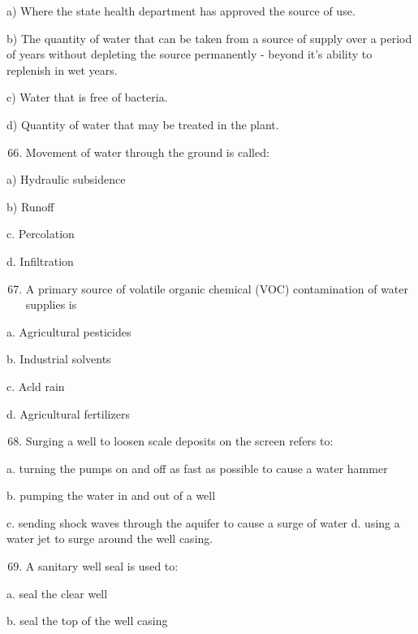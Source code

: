 \documentclass[10pt]{article}
\begin{document}
a) Where the state health department has approved the source of use.

b) The quantity of water that can be taken from a source of supply over a period of years without depleting the source permanently - beyond it's ability to replenish in wet years.

c) Water that is free of bacteria.

d) Quantity of water that may be treated in the plant.

\begin{enumerate}
  \setcounter{enumi}{65}
  \item Movement of water through the ground is called:
\end{enumerate}

a) Hydraulic subsidence

b) Runoff

c. Percolation

d. Infiltration

\begin{enumerate}
  \setcounter{enumi}{66}
  \item A primary source of volatile organic chemical (VOC) contamination of water supplies is
\end{enumerate}

a. Agricultural pesticides

b. Industrial solvents

c. Acld rain

d. Agricultural fertilizers

\begin{enumerate}
  \setcounter{enumi}{67}
  \item Surging a well to loosen scale deposits on the screen refers to:
\end{enumerate}

a. turning the pumps on and off as fast as possible to cause a water hammer

b. pumping the water in and out of a well

c. sending shock waves through the aquifer to cause a surge of water d. using a water jet to surge around the well casing.

\begin{enumerate}
  \setcounter{enumi}{68}
  \item A sanitary well seal is used to:
\end{enumerate}

a. seal the clear well

b. seal the top of the well casing
\end{document}
